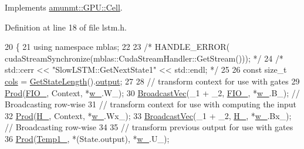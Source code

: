 Implements \hyperlink{classamunmt_1_1GPU_1_1Cell_a16d5711472cd8bdef9652d7a71a1f403}{amunmt\+::\+G\+P\+U\+::\+Cell}.



Definition at line 18 of file lstm.\+h.


\begin{DoxyCode}
20                                                         \{
21       \textcolor{keyword}{using namespace }mblas;
22 
23       \textcolor{comment}{/* HANDLE\_ERROR( cudaStreamSynchronize(mblas::CudaStreamHandler::GetStream())); */}
24       \textcolor{comment}{/* std::cerr << "SlowLSTM::GetNextState1" << std::endl; */}
25 
26       \textcolor{keyword}{const} \textcolor{keywordtype}{size\_t} \hyperlink{namespacemarian_ab9fbdcc76cc853270094524572584222}{cols} = \hyperlink{classamunmt_1_1GPU_1_1SlowLSTM_aec4f004b4e6525758546bf164a5de90b}{GetStateLength}().\hyperlink{structamunmt_1_1GPU_1_1CellLength_af6478b361445f8c7d5b2d45ebc8fd5a6}{output};
27 
28       \textcolor{comment}{// transform context for use with gates}
29       \hyperlink{namespaceamunmt_1_1GPU_1_1mblas_a463b2de180e8ab66bae53d1f8c5bc011}{Prod}(\hyperlink{classamunmt_1_1GPU_1_1SlowLSTM_aa80d0bb5090fbe2a89b7117f89433b57}{FIO\_}, Context, *\hyperlink{classamunmt_1_1GPU_1_1SlowLSTM_a200f343f4c27af61742a106f78f6d564}{w\_}.W\_);
30       \hyperlink{namespaceamunmt_1_1GPU_1_1mblas_ace73de50c8241f219ad490d64513829f}{BroadcastVec}(\_1 + \_2, \hyperlink{classamunmt_1_1GPU_1_1SlowLSTM_aa80d0bb5090fbe2a89b7117f89433b57}{FIO\_}, *\hyperlink{classamunmt_1_1GPU_1_1SlowLSTM_a200f343f4c27af61742a106f78f6d564}{w\_}.B\_); \textcolor{comment}{// Broadcasting row-wise}
31       \textcolor{comment}{// transform context for use with computing the input}
32       \hyperlink{namespaceamunmt_1_1GPU_1_1mblas_a463b2de180e8ab66bae53d1f8c5bc011}{Prod}(\hyperlink{classamunmt_1_1GPU_1_1SlowLSTM_ad43e82ae91c4f3968ebb44110865d8b6}{H\_},  Context, *\hyperlink{classamunmt_1_1GPU_1_1SlowLSTM_a200f343f4c27af61742a106f78f6d564}{w\_}.Wx\_);
33       \hyperlink{namespaceamunmt_1_1GPU_1_1mblas_ace73de50c8241f219ad490d64513829f}{BroadcastVec}(\_1 + \_2, \hyperlink{classamunmt_1_1GPU_1_1SlowLSTM_ad43e82ae91c4f3968ebb44110865d8b6}{H\_}, *\hyperlink{classamunmt_1_1GPU_1_1SlowLSTM_a200f343f4c27af61742a106f78f6d564}{w\_}.Bx\_); \textcolor{comment}{// Broadcasting row-wise}
34 
35       \textcolor{comment}{// transform previous output for use with gates}
36       \hyperlink{namespaceamunmt_1_1GPU_1_1mblas_a463b2de180e8ab66bae53d1f8c5bc011}{Prod}(\hyperlink{classamunmt_1_1GPU_1_1SlowLSTM_a7f4c6738987f74b5e9149f1d7fe0252d}{Temp1\_}, *(State.output), *\hyperlink{classamunmt_1_1GPU_1_1SlowLSTM_a200f343f4c27af61742a106f78f6d564}{w\_}.U\_);

\end{DoxyCode}

